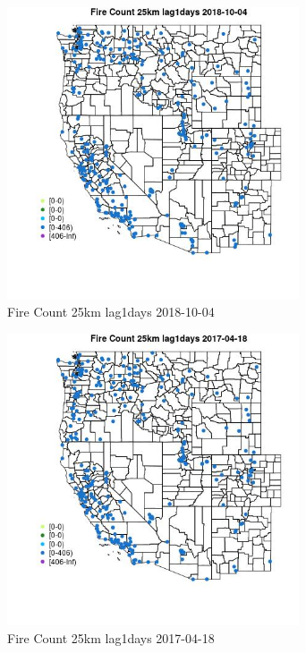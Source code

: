 \begin{figure} 
\centering  
\includegraphics[width=0.77\textwidth]{Code_Outputs/Report_ML_input_PM25_Step4_part_f_de_duplicated_aveswNAs_MapObsFire_Count_25km_lag1days2018-10-04.jpg} 
\caption{\label{fig:Report_ML_input_PM25_Step4_part_f_de_duplicated_aveswNAsMapObsFire_Count_25km_lag1days2018-10-04}Fire Count 25km lag1days 2018-10-04} 
\end{figure} 
 

\begin{figure} 
\centering  
\includegraphics[width=0.77\textwidth]{Code_Outputs/Report_ML_input_PM25_Step4_part_f_de_duplicated_aveswNAs_MapObsFire_Count_25km_lag1days2017-04-18.jpg} 
\caption{\label{fig:Report_ML_input_PM25_Step4_part_f_de_duplicated_aveswNAsMapObsFire_Count_25km_lag1days2017-04-18}Fire Count 25km lag1days 2017-04-18} 
\end{figure} 
 

